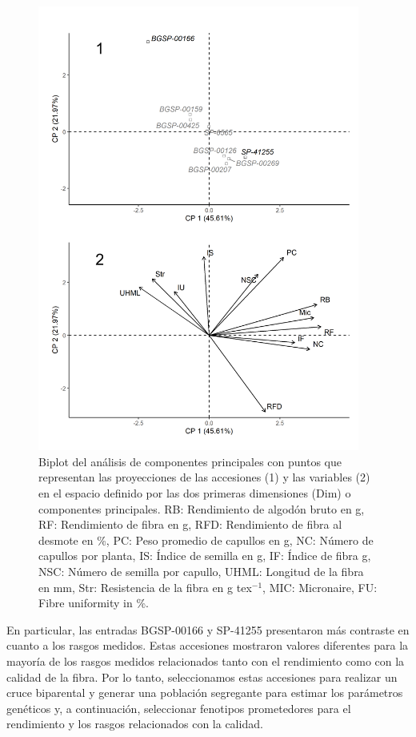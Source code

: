 \documentclass[12pt,oneside]{reedthesis}
\begin{document}
\begin{figure}
\includegraphics[width=400px]{figure/chap1/Para_compuestas/PCA_juntas} \caption{Biplot del análisis de componentes principales con puntos que representan las proyecciones de las accesiones (1) y las variables (2) en el espacio definido por las dos primeras dimensiones (Dim) o componentes principales. RB: Rendimiento de algodón bruto en g, RF: Rendimiento de fibra en g, RFD: Rendimiento de fibra al desmote en \%, PC: Peso promedio de capullos en g, NC: Número de capullos por planta, IS: Índice de semilla en g, IF: Índice de fibra g, NSC: Número de semilla por capullo, UHML: Longitud de la fibra en mm, Str: Resistencia de la fibra en g tex$^{-1}$, MIC: Micronaire, FU: Fibre uniformity in \%.}\label{fig:img-PC}
\end{figure}

En particular, las entradas BGSP-00166 y SP-41255 presentaron más contraste en cuanto a los rasgos medidos. Estas accesiones mostraron valores diferentes para la mayoría de los rasgos medidos relacionados tanto con el rendimiento como con la calidad de la fibra. Por lo tanto, seleccionamos estas accesiones para realizar un cruce biparental y generar una población segregante para estimar los parámetros genéticos y, a continuación, seleccionar fenotipos prometedores para el rendimiento y los rasgos relacionados con la calidad.
\end{document}
